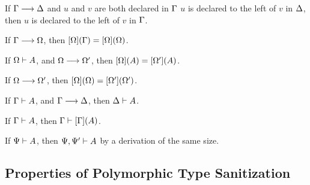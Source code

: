 \begin{lemma}
  \label{lemma:dunfield:ReverseDeclarationOrderPreservation}
  If $\Gamma \longrightarrow \Delta$ and $u$ and $v$ are both declared in $\Gamma$ $u$ is
  declared to the left of $v$ in $\Delta$,
  then $u$ is declared to the left of $v$ in $\Gamma$.
\end{lemma}

\begin{lemma}
  \label{lemma:dunfield:StabilityOfCompleteContexts}
  If $\Gamma \longrightarrow \Omega $,
  then $[\Omega](\Gamma) = [\Omega](\Omega) $.
\end{lemma}

\begin{lemma}
  \label{lemma:dunfield:FinishingTypes}
  If $\Omega \vdash A $,
  and $\Omega \longrightarrow \Omega' $,
  then $[\Omega](A) = [\Omega'](A) $.
\end{lemma}

\begin{lemma}
  \label{lemma:dunfield:FinishingCompletions}
  If $\Omega \longrightarrow \Omega' $,
  then $[\Omega](\Omega) = [\Omega'](\Omega') $.
\end{lemma}

\begin{lemma}
  \label{lemma:dunfield:ExtensionWeakening}
  If $\Gamma \vdash A$,
  and $\Gamma \longrightarrow \Delta$,
  then  $\Delta \vdash A$.
\end{lemma}

\begin{lemma}
  \label{lemma:dunfield:SubstitutionTyping}
  If $\Gamma \vdash A$,
  then  $\Gamma \vdash [\Gamma](A)$.
\end{lemma}

\begin{proposition}[Weakening]
  \label{lemma:dunfield:Weakening}
  If $\Psi \vdash A$,
  then  $\Psi, \Psi' \vdash A$ by a derivation of the same size.
\end{proposition}

\subsection{Properties of Polymorphic Type Sanitization}

\begin{lemma}[\PolymorphicTypeSanitizationExtensionName]\leavevmode
  \label{lemma:\PolymorphicTypeSanitizationExtensionName}
  \PolymorphicTypeSanitizationExtensionBody
\end{lemma}

